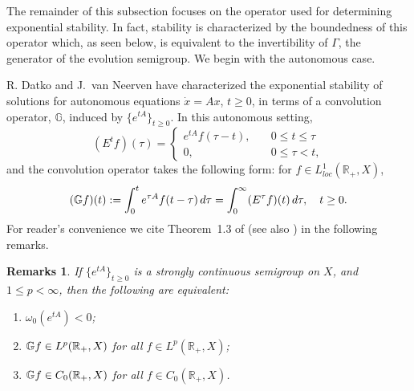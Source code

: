 \documentclass[10pt,psamsfonts,leqno]{siamltex}
\newtheorem{rmks}[prop]{Remarks}
\newcommand{\bbR}{\mathbb{R}}
\newcommand{\lb}{\label}
\newcommand{\CoRp}{{C_0(\bbR_+,X)}}
\newcommand{\LpRp}{{L^p(\bbR_+,X)}}
\begin{document}
The remainder of this subsection focuses on the operator
used for determining exponential stability.  In fact, stability
is characterized by the boundedness of this operator which,
as seen below, is equivalent to the invertibility of
$\Gamma$, the generator of the evolution semigroup.
We begin with the autonomous case.

R. Datko and J.~van Neerven have characterized the exponential
stability of solutions for autonomous equations $\dot x=Ax$,
$t\ge0$, in terms of a convolution operator,
${\mathbb G}$, induced by $\{e^{tA}\}_{t\ge0}$.
In this autonomous setting,
\begin{equation}\lb{AUTevolsgHL}
(E^t f)(\tau)= \begin{cases}
  e^{t A} f(\tau-t),\quad &0 \le t \le \tau \\
0,\qquad &0 \le \tau < t,
  \end{cases}
\end{equation}
and the convolution operator takes the following form: for
$f\in L^1_{loc}(\bbR_+,X)$,
\begin{equation}\lb{AUTbbG}
(\Bbb{G}f)(t):=\int_0^t e^{\tau A}f(t-\tau)\,d\tau
=\int_0^\infty (E^\tau f)(t)\,d\tau ,\quad t\ge 0.
\end{equation}
For reader's convenience we cite Theorem~1.3 of \cite{vanN1}
(see also \cite{Datko}) in the following remarks.

\begin{rmks}\label{AUTvanN} If $\{e^{tA}\}_{t\ge0}$ is a strongly
continuous semigroup on $X$, and $1\le p<\infty$,  then the
following are equivalent:
\begin{enumerate}
\item $\omega_0(e^{tA})<0$;
\item $\Bbb{G}f\in\LpRp$ for all $f\in\LpRp$;
\item $\Bbb{G}f\in\CoRp$ for all $f\in\CoRp$.
\end{enumerate}
\end{rmks}
\end{document}

